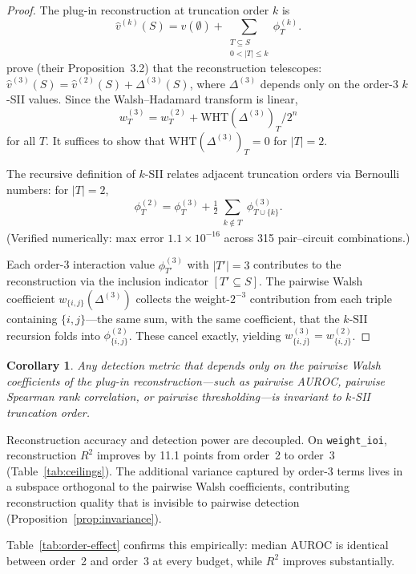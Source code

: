 \documentclass[11pt]{article}
\newtheorem{corollary}{Corollary}
\begin{document}
\begin{proof}
The plug-in reconstruction at truncation order $k$ is
\[
  \hat{v}^{(k)}(S) = v(\emptyset) + \sum_{\substack{T \subseteq S \\ 0 < |T| \leq k}} \phi^{(k)}_T.
\]
\citet{fumagalli2024kernelshapiq} prove (their Proposition~3.2) that
the reconstruction telescopes:
$\hat{v}^{(3)}(S) = \hat{v}^{(2)}(S) + \Delta^{(3)}(S)$,
where $\Delta^{(3)}$ depends only on the order-3 $k$-SII values.
Since the Walsh--Hadamard transform is linear,
\[
  w^{(3)}_T = w^{(2)}_T + \text{WHT}(\Delta^{(3)})_T / 2^n
\]
for all $T$. It suffices to show that
$\text{WHT}(\Delta^{(3)})_T = 0$ for $|T| = 2$.

The recursive definition of $k$-SII
\citep{bordt2023shapley} relates adjacent truncation orders via
Bernoulli numbers: for $|T| = 2$,
\[
  \phi^{(2)}_T = \phi^{(3)}_T + \tfrac{1}{2}
    \sum_{\substack{k \notin T}} \phi^{(3)}_{T \cup \{k\}}.
\]
(Verified numerically: max error $1.1 \times 10^{-16}$ across 315
pair--circuit combinations.)

Each order-3 interaction value $\phi^{(3)}_{T'}$ with $|T'| = 3$
contributes to the reconstruction via the inclusion indicator
$[T' \subseteq S]$. The pairwise Walsh coefficient
$w_{\{i,j\}}(\Delta^{(3)})$ collects the weight-$2^{-3}$ contribution
from each triple containing $\{i,j\}$---the same sum, with the same
coefficient, that the $k$-SII recursion folds into
$\phi^{(2)}_{\{i,j\}}$. These cancel exactly, yielding
$w^{(3)}_{\{i,j\}} = w^{(2)}_{\{i,j\}}$. \qedhere
\end{proof}

\begin{corollary}
Any detection metric that depends only on the pairwise Walsh
coefficients of the plug-in reconstruction---such as pairwise
AUROC, pairwise Spearman rank correlation, or pairwise
thresholding---is invariant to $k$-SII truncation order.
\end{corollary}

Reconstruction accuracy and detection power are decoupled.
On \texttt{weight\_ioi}, reconstruction $R^2$ improves by 11.1
points from order~2 to order~3 (Table~\ref{tab:ceilings}).
The additional variance captured by order-3 terms lives in a
subspace orthogonal to the pairwise Walsh coefficients, contributing
reconstruction quality that is invisible to pairwise detection
(Proposition~\ref{prop:invariance}).

Table~\ref{tab:order-effect} confirms this empirically: median
AUROC is identical between order~2 and order~3 at every budget,
while $R^2$ improves substantially.
\end{document}
